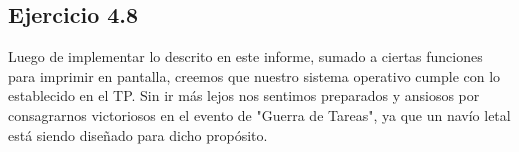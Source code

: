 \bigskip
\bigskip
\bigskip
\bigskip
\bigskip
\bigskip
\bigskip
\bigskip
\bigskip
\bigskip
\subsection{Ejercicio 4.8}
\par{
Luego de implementar lo descrito en este informe, sumado a ciertas funciones para imprimir en pantalla, creemos que nuestro sistema operativo cumple con lo establecido en el TP. Sin ir más lejos nos sentimos preparados y ansiosos por consagrarnos victoriosos en el evento de "Guerra de Tareas", ya que un navío letal está siendo diseñado para dicho propósito.}